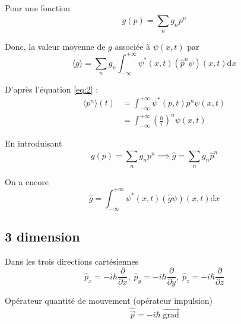 Pour une fonction 
\begin{equation}
  g(p) = \sum_{n}^{} g_n p ^{n}
\end{equation}

Donc, la valeur moyenne de $g$ associée à $\psi(x,t)$ par 
\begin{equation}
  \langle g \rangle = \sum_{n}^{} g_n \int_{- \infty}^{+ \infty} \psi ^{*}(x, t) ( \hat{p} ^{n} \psi) (x,t) \mathrm{d}x
\end{equation}

\begin{myproof}{}{} D'après l'équation \ref{eq:2} :
\begin{align}
  \langle p ^{n} \rangle(t) &= \int_{- \infty}^{+ \infty} \psi ^{*}(p, t) p ^{n} \psi(x,t) \\ 
                            &= \int_{- \infty}^{+ \infty} \left( \frac{\hbar}{i}  \right) ^{n} \psi(x,t)
\end{align}
\end{myproof}


En introduisant 
\begin{equation}
g(p) = \sum_{n}^{} g_n p ^{n} \implies  \hat{g} = \sum_{n}^{} g_n \hat{p} ^{n}
\end{equation}

On a encore 
\begin{equation}
  \hat{g} = \int_{- \infty}^{+ \infty} \psi^*(x,t) (\hat{g} \psi)(x,t) \mathrm{d}x
\end{equation}


\subsection{3 dimension} %
\label{sub:Opérateur impulsion à 3 dimension}

Dans les trois directions cartésiennes 
\begin{equation}
  \hat{p}_x = - i \hbar \frac{\partial }{\partial x}, \;
  \hat{p}_y = - i \hbar \frac{\partial }{\partial y}, \;
  \hat{p}_z = - i \hbar \frac{\partial }{\partial z}
\end{equation}


\begin{Definition}[colbacktitle=red!75!black]{Opérateur quantité de mouvement (opérateur impulsion)}{}
\begin{equation}
  \hat{\overrightarrow{p}} = - i \hbar \; \overrightarrow{\mathrm{grad}}
\end{equation}
\end{Definition}

